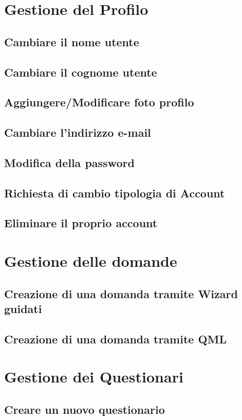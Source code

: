 \newpage
\section{Gestione del Profilo}
\subsection{Cambiare il nome utente}
\subsection{Cambiare il cognome utente}
\subsection{Aggiungere/Modificare foto profilo}
\subsection{Cambiare l'indirizzo e-mail}
\subsection{Modifica della password}
\subsection{Richiesta di cambio tipologia di Account}
\subsection{Eliminare il proprio account}

\section{Gestione delle domande}
\subsection{Creazione di una domanda tramite Wizard guidati}
\subsection{Creazione di una domanda tramite QML}

\section{Gestione dei Questionari}
\subsection{Creare un nuovo questionario}
